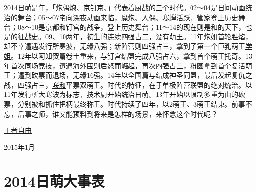 2014日萌是年，「炮偶炮、京钉京、」代表着厨战的三个时代。02～04是日间动画统治的舞台；05～07宅向深夜动画来临，魔炮、人偶、寒蝉活跃，管家登上历史舞台；08～10是京都和钉宫的战争，登上历史舞台；11～14的现在则是和的天下，也是的征战史。09、10两年，初生的连续四强占二，没有萌王。11年炮姐首轮胜焰，却不幸遭遇发行所寒波，无缘八强；新阵营则四强占三，拿到了第一个巨乳萌王\uline{学姐}。12年以阿知贺篇卷土重来，与钉宫结盟完成八强占六，拿到首个萌王托奇。13年首次同场竞技，遭遇海外围剿后怒而崛起，再次四强占三，粉圆拿到首个复活萌王；遭到砍票而退场，无缘16强。14年以全国篇与结成神圣同盟，最后发起复仇之战，四强占三，\uline{咲}\uline{和}平票双萌王。时代的特征，在于单极阵营联盟的绝对统治。以11年发行所大寒波为标志，技术厨开始统治日萌。13年开始以限制多重为由的砍票，分别被和抓住把柄最终称王。时代持续了四年，以2萌王、3萌王结束。前事不忘，后事之师，谁又能预料到将来是怎样的场景，来怀念这个时代呢？

\begin{flushright}
  \rm\kasho \uline{王者自由}

  \kai 2015年1月
\end{flushright}

\chapter*{2014日萌大事表}

